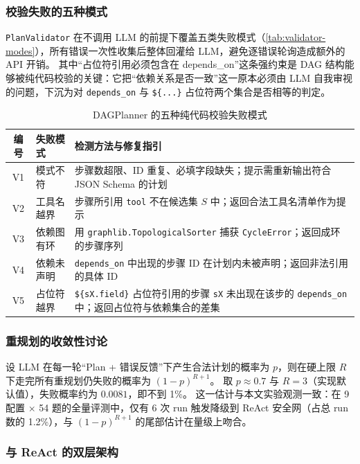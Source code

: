 \subsubsection{校验失败的五种模式}

\texttt{PlanValidator} 在不调用 LLM 的前提下覆盖五类失败模式（\autoref{tab:validator-modes}），所有错误一次性收集后整体回灌给 LLM，避免逐错误轮询造成额外的 API 开销。
其中“占位符引用必须包含在 depends\_on”这条强约束是 DAG 结构能够被纯代码校验的关键：它把“依赖关系是否一致”这一原本必须由 LLM 自我审视的问题，下沉为对 \texttt{depends\_on} 与 \verb|${...}| 占位符两个集合是否相等的判定。

\begin{table}[htbp]
    \centering
    \caption{\label{tab:validator-modes}DAGPlanner 的五种纯代码校验失败模式}
    \begin{tabularx}{\linewidth}{clX}
        \toprule
        编号 & 失败模式 & 检测方法与修复指引 \\ \midrule
        V1 & 模式不符 & 步骤数超限、ID 重复、必填字段缺失；提示需重新输出符合 JSON Schema 的计划 \\
        V2 & 工具名越界 & 步骤所引用 \texttt{tool} 不在候选集 $S$ 中；返回合法工具名清单作为提示 \\
        V3 & 依赖图有环 & 用 \texttt{graphlib.TopologicalSorter} 捕获 \texttt{CycleError}；返回成环的步骤序列 \\
        V4 & 依赖未声明 & \texttt{depends\_on} 中出现的步骤 ID 在计划内未被声明；返回非法引用的具体 ID \\
        V5 & 占位符越界 & \verb|${sX.field}| 占位符引用的步骤 \texttt{sX} 未出现在该步的 \texttt{depends\_on} 中；返回占位符与依赖集合的差集 \\ \bottomrule
    \end{tabularx}
\end{table}

\subsubsection{重规划的收敛性讨论}

设 LLM 在每一轮“Plan + 错误反馈”下产生合法计划的概率为 $p$，则在硬上限 $R$ 下走完所有重规划仍失败的概率为 $(1-p)^{R+1}$。
取 $p\approx 0.7$ 与 $R=3$（实现默认值），失败概率约为 $0.0081$，即不到 1\%。
这一估计与本文实验观测一致：在 9 配置 $\times$ 54 题的全量评测中，仅有 6 次 run 触发降级到 ReAct 安全网（占总 run 数的 1.2\%），与 $(1-p)^{R+1}$ 的尾部估计在量级上吻合。

\subsubsection{与 ReAct 的双层架构}

